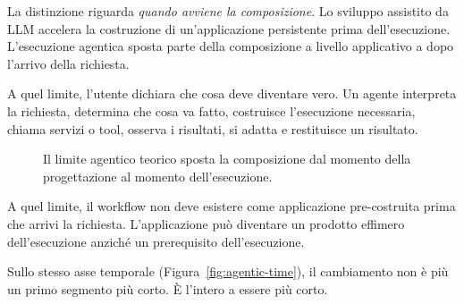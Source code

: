 \documentclass[10pt,oneside,openany]{book}
\begin{document}
La distinzione riguarda \emph{quando avviene la composizione}. Lo sviluppo assistito da LLM accelera la costruzione di un'applicazione persistente prima dell'esecuzione. L'esecuzione agentica sposta parte della composizione a livello applicativo a dopo l'arrivo della richiesta.

A quel limite, l'utente dichiara che cosa deve diventare vero. Un agente interpreta la richiesta, determina che cosa va fatto, costruisce l'esecuzione necessaria, chiama servizi o tool, osserva i risultati, si adatta e restituisce un risultato.

\begin{figure}[!htbp]
\centering
{}
\caption{Il limite agentico teorico sposta la composizione dal momento della progettazione al momento dell'esecuzione.}
\end{figure}

A quel limite, il workflow non deve esistere come applicazione pre-costruita prima che arrivi la richiesta. L'applicazione può diventare un prodotto effimero dell'esecuzione anziché un prerequisito dell'esecuzione.

Sullo stesso asse temporale (Figura~\ref{fig:agentic-time}), il cambiamento non è più un primo segmento più corto. È l'intero a essere più corto.
\end{document}
